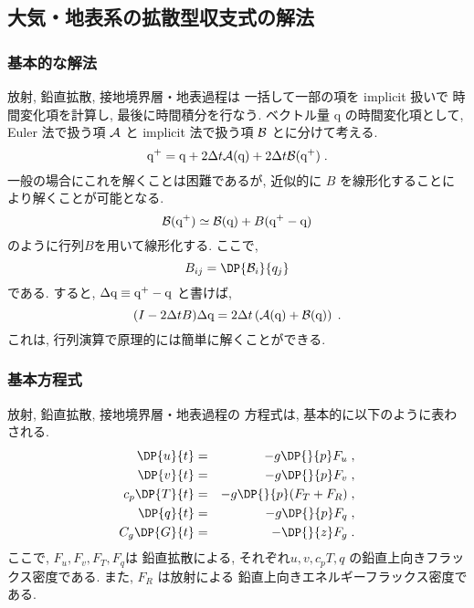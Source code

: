 ﻿
\subsection{大気・地表系の拡散型収支式の解法}

\subsubsection{基本的な解法}

放射, 鉛直拡散, 接地境界層・地表過程は
一括して一部の項を implicit 扱いで
時間変化項を計算し, 最後に時間積分を行なう.
ベクトル量 {\boldmath q} の時間変化項として,
Euler 法で扱う項 ${\cal A}$ と implicit 法で扱う項 ${\cal B}$ とに分けて考える.
%
\begin{equation}
  \mbox{\boldmath q}^+ 
      = \mbox{\boldmath q} + 2 \Delta t {\cal A}( \mbox{\boldmath q}   )
                           + 2 \Delta t {\cal B}( \mbox{\boldmath q}^+ ) \; . 
\end{equation}
%
一般の場合にこれを解くことは困難であるが,
近似的に $B$ を線形化することにより解くことが可能となる.
\begin{equation}
  {\cal B}( \mbox{\boldmath q}^+ ) 
                           \simeq {\cal B}( \mbox{\boldmath q} ) 
                            + B( \mbox{\boldmath q}^+ - \mbox{\boldmath q} )
\end{equation}
のように行列$B$を用いて線形化する.
ここで,
\begin{equation}
  B_{ij} = \DP{{\cal B}_i}{q_j}
\end{equation}
である. 
すると, 
$\Delta \mbox{\boldmath q} \equiv \mbox{\boldmath q}^+ - \mbox{\boldmath q}$
と書けば,
\begin{equation}
  ( I - 2 \Delta t B ) \Delta \mbox{\boldmath q} 
      = 2 \Delta t \left(  {\cal A}( \mbox{\boldmath q} )
                         + {\cal B}( \mbox{\boldmath q} ) \right) \; . 
\end{equation}
%
これは, 行列演算で原理的には簡単に解くことができる.

\subsubsection{基本方程式}

放射, 鉛直拡散, 接地境界層・地表過程の
方程式は, 基本的に以下のように表わされる.
%
\begin{eqnarray}
     \DP{u}{t}  & = &  - g \DP{}{p} F_u \; , \\
     \DP{v}{t}  & = &  - g \DP{}{p} F_v \; , \\
 c_p \DP{T}{t}  & = &  - g \DP{}{p} ( F_T + F_R ) \; , \\
     \DP{q}{t}  & = &  - g \DP{}{p} F_q \; , \\
 C_g \DP{G}{t}  & = &  -   \DP{}{z} F_g \; .
\end{eqnarray}
%
ここで, $F_u, F_v, F_T, F_q$は
鉛直拡散による, それぞれ$u, v, c_p T, q$
の鉛直上向きフラックス密度である.
また, $F_R$ は放射による
鉛直上向きエネルギーフラックス密度である.

